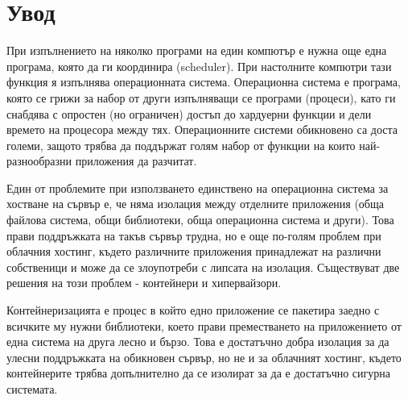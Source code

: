 \chapter*{Увод}


При изпълнението на няколко програми на един компютър е нужна още една програма, която да ги координира (scheduler). При настолните компютри тази функция я изпълнява операционната система.
Операционна система е програма, която се грижи за набор от други изпълняващи се програми (процеси), като ги снабдява с опростен (но ограничен) достъп до хардуерни функции и дели времето на процесора между тях. Операционните системи обикновено са доста големи, защото трябва да поддържат голям набор от функции на които най-разнообразни приложения да разчитат.

Един от проблемите при използването единствено на операционна система за хостване на сървър е, че няма изолация между отделните приложения (обща файлова система, общи библиотеки, обща операционна система и други). Това прави поддръжката на такъв сървър трудна, но е още по-голям проблем при облачния хостинг, където различните приложения принадлежат на различни собственици и може да се злоупотреби с липсата на изолация.
Съществуват две решения на този проблем - контейнери и хипервайзори.

Контейнеризацията е процес в който едно приложение се пакетира заедно с всичките му нужни библиотеки, което прави преместването на приложението от една система на друга лесно и бързо. Това е достатъчно добра изолация за да улесни поддръжката на обикновен сървър, но не и за облачният хостинг, където контейнерите трябва допълнително да се изолират за да е достатъчно сигурна системата.

